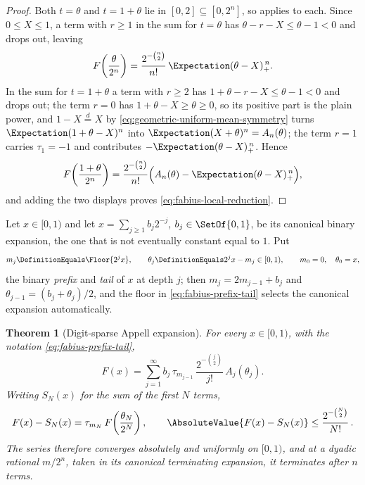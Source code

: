 \documentclass[11pt,a4paper,oneside,openany]{book}
\newtheorem{theorem}{Theorem}[chapter]
\theoremstyle{definition}
\theoremstyle{remark}
\begin{document}
\begin{proof}
Both $t=\theta$ and $t=1+\theta$ lie in $[0,2]\subseteq[0,2^n]$, so
 applies to each.  Since $0\le X\le1$, a term with
$r\ge1$ in the sum for $t=\theta$ has $\theta-r-X\le\theta-1<0$ and drops out,
leaving
\[
 F\!\left(\frac{\theta}{2^n}\right)
 =\frac{2^{-\binom n2}}{n!}\,\Expectation(\theta-X)_+^{\,n}.
\]
In the sum for $t=1+\theta$ a term with $r\ge2$ has $1+\theta-r-X\le\theta-1<0$
and drops out; the term $r=0$ has $1+\theta-X\ge\theta\ge0$, so its positive part
is the plain power, and $1-X\overset d=X$ by
\eqref{eq:geometric-uniform-mean-symmetry} turns
$\Expectation(1+\theta-X)^n$ into $\Expectation(X+\theta)^n=A_n(\theta)$; the term
$r=1$ carries $\tau_1=-1$ and contributes $-\Expectation(\theta-X)_+^{\,n}$.  Hence
\[
 F\!\left(\frac{1+\theta}{2^n}\right)
 =\frac{2^{-\binom n2}}{n!}\Bigl(A_n(\theta)-\Expectation(\theta-X)_+^{\,n}\Bigr),
\]
and adding the two displays proves \eqref{eq:fabius-local-reduction}.
\end{proof}

Let $x\in[0,1)$ and let $x=\sum_{j\ge1}b_j2^{-j}$, $b_j\in\SetOf{0,1}$, be its
canonical binary expansion, the one that is not eventually constant equal to
$1$.  Put
\begin{equation}\label{eq:fabius-prefix-tail}
 m_j\DefinitionEquals\Floor{2^jx},
 \qquad
 \theta_j\DefinitionEquals2^jx-m_j\in[0,1),
 \qquad
 m_0=0,\quad\theta_0=x,
\end{equation}
the binary \emph{prefix} and \emph{tail} of $x$ at depth $j$; then
$m_j=2m_{j-1}+b_j$ and $\theta_{j-1}=(b_j+\theta_j)/2$, and the floor in
\eqref{eq:fabius-prefix-tail} selects the canonical expansion automatically.

\begin{theorem}[Digit-sparse Appell expansion]\label{thm:fabius-digit-expansion}
For every $x\in[0,1)$, with the notation \eqref{eq:fabius-prefix-tail},
\begin{equation}\label{eq:fabius-digit-appell}
 \boxed{\;
 F(x)=\sum_{j=1}^{\infty}
 b_j\,\tau_{m_{j-1}}\,\frac{2^{-\binom j2}}{j!}\,A_j(\theta_j).\;}
\end{equation}
Writing $S_N(x)$ for the sum of the first $N$ terms,
\begin{equation}\label{eq:fabius-digit-residual}
 F(x)-S_N(x)=\tau_{m_N}\,F\!\left(\frac{\theta_N}{2^N}\right),
 \qquad
 \AbsoluteValue{F(x)-S_N(x)}\le\frac{2^{-\binom N2}}{N!}\,.
\end{equation}
The series therefore converges absolutely and uniformly on $[0,1)$, and at a
dyadic rational $m/2^n$, taken in its canonical terminating expansion, it
terminates after $n$ terms.
\end{theorem}
\end{document}

